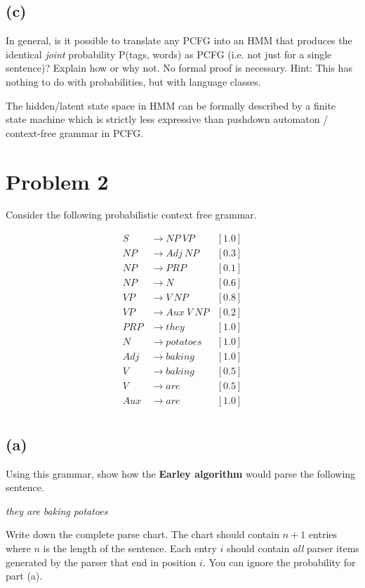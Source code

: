 \documentclass[twoside,11pt]{homework}
\begin{document}
\subsection*{(c)}
\begin{prob}
  In general, is it possible to translate any PCFG into an HMM that produces the
  identical \textit{joint} probability P(tags, words) as PCFG (i.e. not just for
  a single sentence)? Explain how or why not. No formal proof is necessary.
  Hint: This has nothing to do with probabilities, but with language classes.
\end{prob}
\begin{solution}
  The hidden/latent state space in HMM can be formally described
  by a finite state machine which is strictly less expressive than pushdown
  automaton / context-free grammar in PCFG.
\end{solution}

\section*{Problem 2}

Consider the following probabilistic context free grammar.

\[
  \begin{aligned}
    S &\rightarrow NP\ VP &[1.0]\\
    NP &\rightarrow Adj\ NP &[0.3]\\
    NP &\rightarrow PRP &[0.1]\\
    NP &\rightarrow N &[0.6]\\
    VP &\rightarrow V\ NP &[0.8]\\
    VP &\rightarrow Aux\ V\ NP &[0.2]\\
    PRP &\rightarrow they &[1.0]\\
    N &\rightarrow potatoes &[1.0]\\
    Adj &\rightarrow baking &[1.0]\\
    V &\rightarrow baking &[0.5]\\
    V &\rightarrow are &[0.5]\\
    Aux &\rightarrow are &[1.0]\\
  \end{aligned}
\]

\subsection*{(a)}
\begin{prob}
  Using this grammar, show how the \textbf{Earley algorithm} would parse the
  following sentence.

  \textit{they are baking potatoes}

  Write down the complete parse chart.
  The chart should contain $n + 1$ entries where $n$ is the length of the
  sentence.
  Each entry $i$ should contain \textit{all} parser items generated by the
  parser that end in position $i$.
  You can ignore the probability for part (a).
\end{prob}
\end{document}
